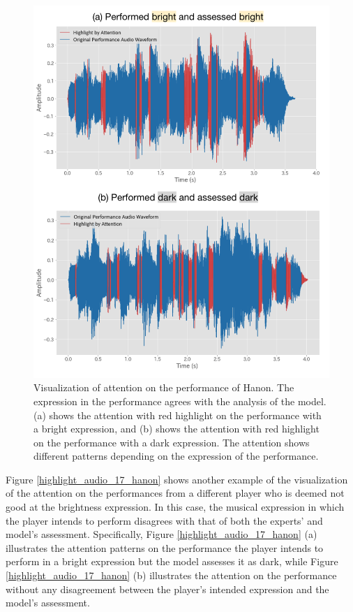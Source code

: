 \documentclass[sigconf,review,anonymous]{acmart}
\begin{document}
\begin{figure}[h!]
  \centering
  \includegraphics[width=\linewidth]{figures/highlight_audio_0_hanon.png}
  \caption{Visualization of attention on the performance of Hanon. The expression in the performance agrees with the analysis of the model. (a) shows the attention with red highlight on the performance with a bright expression, and (b) shows the attention with red highlight on the performance with a dark expression. The attention shows different patterns depending on the expression of the performance.}
  \label{highlight_audio_0_hanon}
\end{figure}

Figure \ref{highlight_audio_17_hanon} shows another example of the visualization of the attention on the performances from a different player who is deemed not good at the brightness expression.
In this case, the musical expression in which the player intends to perform disagrees with that of both the experts' and model's assessment.
Specifically, Figure \ref{highlight_audio_17_hanon} (a) illustrates the attention patterns on the performance the player intends to perform in a bright expression but the model assesses it as dark, while Figure \ref{highlight_audio_17_hanon} (b) illustrates the attention on the performance without any disagreement between the player's intended expression and the model's assessment.
\end{document}
